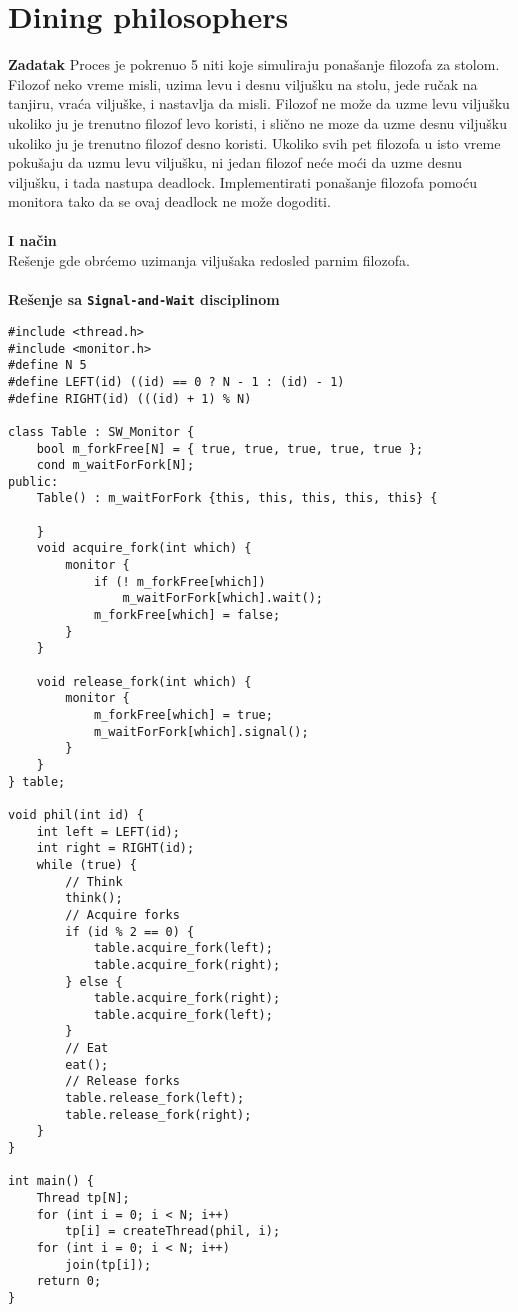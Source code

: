 \clearpage
\section{Dining philosophers}
\textbf{\large Zadatak} Proces je pokrenuo 5 niti koje simuliraju pona\v{s}anje filozofa za stolom. Filozof neko vreme misli, uzima levu i desnu vilju\v{s}ku na stolu, jede ru\v{c}ak na tanjiru, vra\'{c}a vilju\v{s}ke, i nastavlja da misli. Filozof ne mo\v{z}e da uzme levu vilju\v{s}ku ukoliko ju je trenutno filozof levo koristi, i sli\v{c}no ne mo{z}e da uzme desnu vilju\v{s}ku ukoliko ju je trenutno filozof desno koristi. Ukoliko svih pet filozofa u isto vreme poku\v{s}aju da uzmu levu vilju\v{s}ku, ni jedan filozof ne\'{c}e mo\'{c}i da uzme desnu vilju\v{s}ku, i tada nastupa deadlock. Implementirati pona\v{s}anje filozofa pomo\'{c}u monitora tako da se ovaj deadlock ne mo\v{z}e dogoditi.
\\\\
\textbf{\large I na\v{c}in}\\
Re\v{s}enje gde obr\'{c}emo uzimanja vilju\v{s}aka redosled parnim filozofa.
\\\\
\textbf{Re\v{s}enje sa \texttt{Signal-and-Wait} disciplinom}
\begin{lstlisting}
#include <thread.h>
#include <monitor.h>
#define N 5
#define LEFT(id) ((id) == 0 ? N - 1 : (id) - 1)
#define RIGHT(id) (((id) + 1) % N)

class Table : SW_Monitor {
    bool m_forkFree[N] = { true, true, true, true, true };
    cond m_waitForFork[N];
public:
    Table() : m_waitForFork {this, this, this, this, this} {
        
    }
    void acquire_fork(int which) {
        monitor {
            if (! m_forkFree[which]) 
                m_waitForFork[which].wait();
            m_forkFree[which] = false;
        }
    }

    void release_fork(int which) {
        monitor {
            m_forkFree[which] = true;
            m_waitForFork[which].signal();
        }
    }
} table;

void phil(int id) {
    int left = LEFT(id);
    int right = RIGHT(id);
    while (true) {
        // Think
        think();
        // Acquire forks
        if (id % 2 == 0) {
            table.acquire_fork(left);
            table.acquire_fork(right);
        } else {
            table.acquire_fork(right);
            table.acquire_fork(left);
        }
        // Eat
        eat();
        // Release forks
        table.release_fork(left);
        table.release_fork(right);
    }
}

int main() {
    Thread tp[N];
    for (int i = 0; i < N; i++) 
        tp[i] = createThread(phil, i);
    for (int i = 0; i < N; i++) 
        join(tp[i]);
    return 0;
}

\end{lstlisting}
